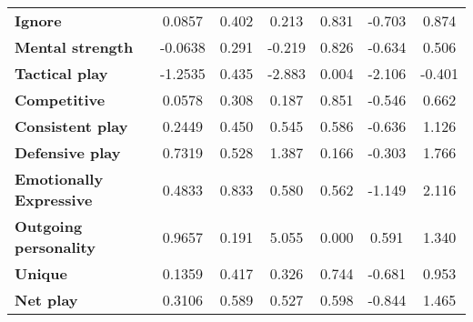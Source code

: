\begin{center}
\begin{tabular}{lcccccc}
\textbf{Ignore}                 &       0.0857  &        0.402     &     0.213  &         0.831        &       -0.703    &        0.874     \\
\textbf{Mental strength}        &      -0.0638  &        0.291     &    -0.219  &         0.826        &       -0.634    &        0.506     \\
\textbf{Tactical play}          &      -1.2535  &        0.435     &    -2.883  &         0.004        &       -2.106    &       -0.401     \\
\textbf{Competitive}            &       0.0578  &        0.308     &     0.187  &         0.851        &       -0.546    &        0.662     \\
\textbf{Consistent play}        &       0.2449  &        0.450     &     0.545  &         0.586        &       -0.636    &        1.126     \\
\textbf{Defensive play}         &       0.7319  &        0.528     &     1.387  &         0.166        &       -0.303    &        1.766     \\
\textbf{Emotionally Expressive} &       0.4833  &        0.833     &     0.580  &         0.562        &       -1.149    &        2.116     \\
\textbf{Outgoing personality}   &       0.9657  &        0.191     &     5.055  &         0.000        &        0.591    &        1.340     \\
\textbf{Unique}                 &       0.1359  &        0.417     &     0.326  &         0.744        &       -0.681    &        0.953     \\
\textbf{Net play}               &       0.3106  &        0.589     &     0.527  &         0.598        &       -0.844    &        1.465     \\
\bottomrule
\end{tabular}
\end{center}